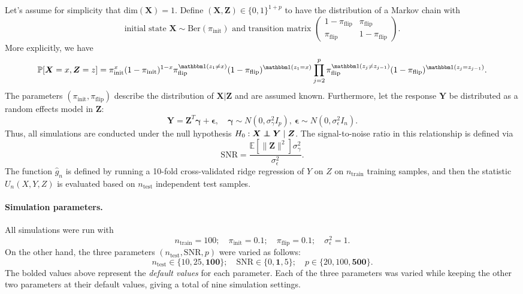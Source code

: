 \documentclass[12pt]{article}
\theoremstyle{definition}
\theoremstyle{remark}
\def\independenT#1#2{\mathrel{\rlap{$#1#2$}\mkern2mu{#1#2}}}
\newcommand\independent{\protect\mathpalette{\protect\independenT}{\perp}}
\newcommand{\eps}{\epsilon}
\newcommand{\prx}{\bm X}
\newcommand{\srx}{X}
\newcommand{\prz}{\bm Z}
\newcommand{\srz}{Z}
\newcommand{\pry}{{\bm Y}}
\newcommand{\sry}{Y}
\newcommand{\peps}{\bm \epsilon}
\begin{document}
Let's assume for simplicity that $\text{dim}(\prx) = 1$. Define $(\prx,\prz) \in \{0,1\}^{1+p}$ to have the distribution of a Markov chain with 
\begin{equation*}
	\text{initial state } \prx \sim \text{Ber}(\pi_{\text{init}}) \text{ and transition matrix } \begin{pmatrix}1-\pi_\text{flip} & \pi_{\text{flip}} \\  \pi_{\text{flip}} &  1-\pi_{\text{flip}}\end{pmatrix}.
\end{equation*}
More explicitly, we have
\begin{equation*}
	\mathbb P[\prx = x, \prz = z] = \pi_{\text{init}}^{x}(1-\pi_{\text{init}})^{1-x} \pi_{\text{flip}}^{\mathbbm 1(z_1 \neq x)} (1-\pi_{\text{flip}})^{\mathbbm 1(z_1 = x)} \prod_{j = 2}^p \pi_{\text{flip}}^{\mathbbm 1(z_j \neq z_{j-1})} (1-\pi_{\text{flip}})^{\mathbbm 1(z_j = z_{j-1})}.
\end{equation*}
The parameters $(\pi_{\text{init}}, \pi_{\text{flip}})$ describe the distribution of $\prx|\prz$ and are assumed known. Furthermore, let the response $\pry$ be distributed as a random effects model in $\prz$:
\begin{equation*}
	\pry = \prz^T \bm \gamma + \peps, \quad \bm \gamma \sim N(0, \sigma^2_{\gamma}I_p),\ \peps \sim N(0, \sigma^2_\eps I_n).
\end{equation*}
Thus, all simulations are conducted under the null hypothesis $H_0: \prx \independent \pry \mid \prz$. The signal-to-noise ratio in this relationship is defined via
\begin{equation*}
	\text{SNR} = \frac{\mathbb E[\|\prz\|^2]\sigma^2_\gamma}{\sigma^2_\eps}.
\end{equation*}
The function $\widehat g_n$ is defined by running a 10-fold cross-validated ridge regression of $\sry$ on $\srz$ on $n_{\text{train}}$ training samples, and then the statistic $U_n(\srx, \sry, \srz)$ is evaluated based on $n_{\text{test}}$ independent test samples.

\paragraph{Simulation parameters.}

All simulations were run with 
\begin{equation}
	n_{\text{train}} = 100; \quad \pi_{\text{init}} = 0.1; \quad \pi_{\text{flip}} = 0.1; \quad \sigma^2_\eps = 1. 
	\label{fixed-parameters}
\end{equation}
On the other hand, the three parameters $(n_{\text{test}}, \text{SNR}, p)$ were varied as follows:
\begin{equation*}
	n_{\text{test}} \in \{10, 25, \textbf{100}\}; \quad  \text{SNR} \in \{0, \textbf{1}, 5\}; \quad p \in \{20, 100, \textbf{500}\}.
\end{equation*}
The bolded values above represent the \textit{default values} for each parameter. Each of the three parameters was varied while keeping the other two parameters at their default values, giving a total of nine simulation settings. 
\end{document}
